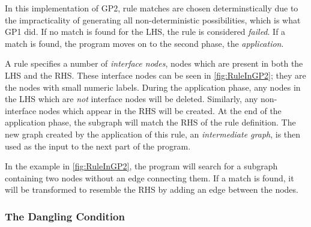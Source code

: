 \documentclass[authoryearcitations]{UoYCSproject}
\begin{document}
In this implementation of GP2, rule matches are chosen determinstically due to the
impracticality of generating all non-deterministic possibilities, which is what GP1 did.
If no match is found for the LHS, the rule is considered \emph{failed}. If a match is
found, the program moves on to the second phase, the \emph{application}.

A rule specifies a number of \emph{interface nodes}, nodes which are present in both
the LHS and the RHS. These interface nodes can be seen in \autoref{fig:RuleInGP2}; they
are the nodes with small numeric labels. During the application phase, any nodes in the
LHS which are \emph{not} interface nodes will be deleted. Similarly, any non-interface
nodes which appear in the RHS will be created. At the end of the application phase,
the subgraph will match the RHS of the rule definition. The new graph created by the
application of this rule, an \emph{intermediate graph}, is then used as the input to
the next part of the program.

In the example in \autoref{fig:RuleInGP2}, the program will search for a subgraph
containing two nodes without an edge connecting them. If a match is found, it will
be transformed to resemble the RHS by adding an edge between the nodes.


\subsubsection{The Dangling Condition}
\label{sec:TheDanglingCondition}
\end{document}
